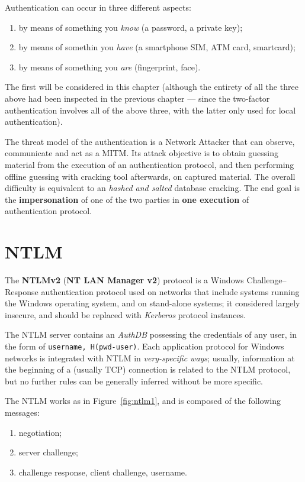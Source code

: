 \documentclass[10pt]{\classname}
\begin{document}
Authentication can occur in three different aspects:
\begin{enumerate}
    \item by means of something you \emph{know} (a password, a private key);
    \item by means of somethin you \emph{have} (a smartphone SIM, ATM card,
        smartcard);
    \item by means of something you \emph{are} (fingerprint, face).
\end{enumerate}

The first will be considered in this chapter (although the entirety of all the
three above had been inspected in the previous chapter --- since the
two\--factor authentication involves all of the above three, with the latter
only used for local authentication).

The threat model of the authentication is a Network Attacker that can observe,
communicate and act as a MITM. Its attack objective is to obtain guessing
material from the execution of an authentication protocol, and then performing
offline guessing with cracking tool afterwards, on captured material. The
overall difficulty is equivalent to an \emph{hashed and salted} database
cracking. The end goal is the \textbf{impersonation} of one of the two parties
in \textbf{one execution} of authentication protocol.

\section{NTLM}

The \textbf{NTLMv2} (\textbf{NT LAN Manager v2}) protocol is a Windows
Challenge\---Response authentication protocol used on networks that include
systems running the Windows operating system, and on stand\--alone systems; it
considered largely insecure, and should be replaced with \emph{Kerberos}
protocol instances.

The NTLM server contains an \emph{AuthDB} possessing the credentials of any
user, in the form of \texttt{username, H(pwd-user)}. Each application protocol
for Windows networks is integrated with NTLM in \emph{very\--specific ways};
usually, information at the beginning of a (usually TCP) connection is related
to the NTLM protocol, but no further rules can be generally inferred without be
more specific.

The NTLM works as in Figure~\ref{fig:ntlm1}, and is composed of the following
messages:
\begin{enumerate}
    \item negotiation;
    \item server challenge;
    \item challenge response, client challenge, username.
\end{enumerate}
\end{document}
